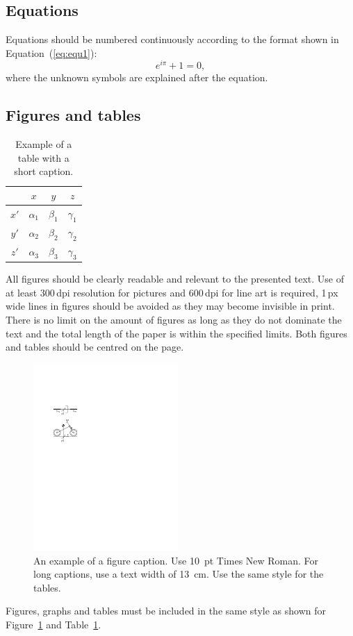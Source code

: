 \documentclass{bmd2016p}
\begin{document}
\subsection{Equations}

Equations should be numbered continuously according to the format shown in 
Equation~(\ref{eq:equ1}): 
\begin{equation} \label{eq:equ1}
  e^{i\pi} + 1 = 0, 
\end{equation}
where the unknown symbols are explained after the equation.


\subsection{Figures and tables}

\begin{table}[h!]
\begin{center}
\caption{Example of a table with a short caption.} \label{tab:tab1}
\begin{tabular}{|c|ccc|}
\hline
    &  $x$  &  $y$  &  $z$ \\
\hline
$x'$  &  $\alpha_1$ & $\beta_1$ & $\gamma_1$ \\
$y'$  &  $\alpha_2$ & $\beta_2$ & $\gamma_2$ \\
$z'$  &  $\alpha_3$ & $\beta_3$ & $\gamma_3$ \\
\hline
\end{tabular}
\end{center}
\end{table}
All figures should be clearly readable and relevant to the presented text. Use 
of at least 300\,dpi resolution for pictures and 600\,dpi for line art is 
required, 1\,px wide lines in figures should be avoided as they may become 
invisible in print. There is no limit on the amount of figures as long as they 
do not dominate the text and the total length of the paper is within the 
specified limits. Both figures and tables should be centred on the page.

\begin{figure}[h!]
\begin{center}
  \includegraphics[width=55mm]{figure1}
  \caption{An example of a figure caption. Use 10~pt Times New Roman.
           For long captions, use a text width of 13~cm.
           Use the same style for the tables.} \label{fig:fig1}
\end{center}
\end{figure}
Figures, graphs and tables must be included in the same style as shown for 
Figure~\ref{fig:fig1} and Table~\ref{tab:tab1}.
\end{document}
